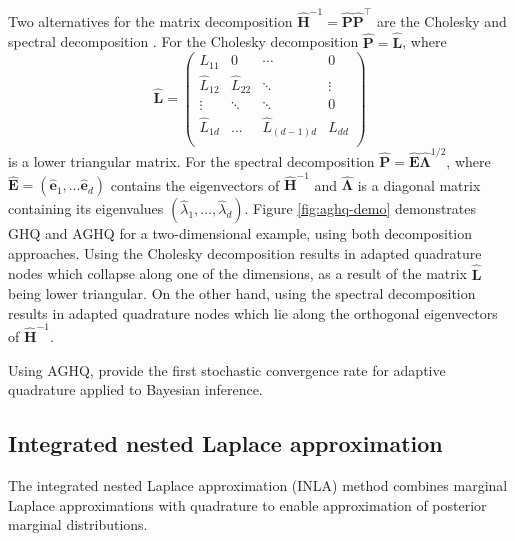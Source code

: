 \documentclass[a4paper, nobind]{templates/ociamthesis}
\begin{document}
Two alternatives for the matrix decomposition \(\hat{\boldsymbol{\mathbf{H}}}^{-1} = \hat{\mathbf{P}} \hat{\mathbf{P}}^\top\) are the Cholesky and spectral decomposition \autocite{jackel2005note}.
For the Cholesky decomposition \(\hat{\mathbf{P}} = \hat{\mathbf{L}}\), where
\begin{equation}
\hat{\mathbf{L}} =
\begin{pmatrix}
L_{11} & 0 & \cdots & 0 \\
\hat{L}_{12} & \hat{L}_{22} & \ddots & \vdots \\
\vdots & \ddots& \ddots& 0 \\
\hat{L}_{1d} & \ldots& \hat{L}_{(d-1)d} & \hat{L}_{dd}\\
\end{pmatrix}
\end{equation}
is a lower triangular matrix.
For the spectral decomposition \(\hat{\mathbf{P}} = \hat{\mathbf{E}} \hat{\mathbf{\Lambda}}^{1/2}\), where \(\hat{\mathbf{E}} = (\hat{\mathbf{e}}_{1}, \ldots \hat{\mathbf{e}}_{d})\) contains the eigenvectors of \(\hat{\mathbf{H}}^{-1}\) and \(\hat{\mathbf{\Lambda}}\) is a diagonal matrix containing its eigenvalues \((\hat \lambda_{1}, \ldots, \hat \lambda_{d})\).
Figure \ref{fig:aghq-demo} demonstrates GHQ and AGHQ for a two-dimensional example, using both decomposition approaches.
Using the Cholesky decomposition results in adapted quadrature nodes which collapse along one of the dimensions, as a result of the matrix \(\hat{\mathbf{L}}\) being lower triangular.
On the other hand, using the spectral decomposition results in adapted quadrature nodes which lie along the orthogonal eigenvectors of \(\hat{\mathbf{H}}^{-1}\).

Using AGHQ, \textcite{bilodeau2022stochastic} provide the first stochastic convergence rate for adaptive quadrature applied to Bayesian inference.

\hypertarget{inla}{%
\subsection{Integrated nested Laplace approximation}\label{inla}}

The integrated nested Laplace approximation (INLA) method \autocite{rue2009approximate} combines marginal Laplace approximations with quadrature to enable approximation of posterior marginal distributions.
\end{document}
